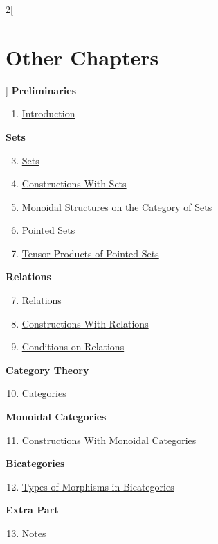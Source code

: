 \begin{multicols}{2}[\section{Other Chapters}]
\noindent
\textbf{Preliminaries}
\begin{enumerate}
\item \hyperref[introduction:section-phantom]{Introduction}
\end{enumerate}
\textbf{Sets}
\begin{enumerate}
\setcounter{enumi}{2}
\item \hyperref[sets:section-phantom]{Sets}
\item \hyperref[constructions-with-sets:section-phantom]{Constructions With Sets}
\item \hyperref[monoidal-structures-on-the-category-of-sets:section-phantom]{Monoidal Structures on the Category of Sets}
\item \hyperref[pointed-sets:section-phantom]{Pointed Sets}
\item \hyperref[tensor-products-of-pointed-sets:section-phantom]{Tensor Products of Pointed Sets}
\end{enumerate}
\textbf{Relations}
\begin{enumerate}
\setcounter{enumi}{6}
\item \hyperref[relations:section-phantom]{Relations}
\item \hyperref[constructions-with-relations:section-phantom]{Constructions With Relations}
\item \hyperref[conditions-on-relations:section-phantom]{Conditions on Relations}
\end{enumerate}
\textbf{Category Theory}
\begin{enumerate}
\setcounter{enumi}{9}
\item \hyperref[categories:section-phantom]{Categories}
\end{enumerate}
\textbf{Monoidal Categories}
\begin{enumerate}
\setcounter{enumi}{10}
\item \hyperref[constructions-with-monoidal-categories:section-phantom]{Constructions With Monoidal Categories}
\end{enumerate}
\textbf{Bicategories}
\begin{enumerate}
\setcounter{enumi}{11}
\item \hyperref[types-of-morphisms-in-bicategories:section-phantom]{Types of Morphisms in Bicategories}
\end{enumerate}
\textbf{Extra Part}
\begin{enumerate}
\setcounter{enumi}{12}
\item \hyperref[notes:section-phantom]{Notes}
\end{enumerate}
\end{multicols}
